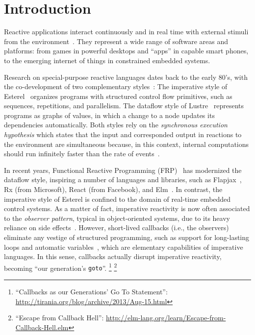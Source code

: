 \documentclass[preprint]{sigplanconf}
\newcommand{\code}[1] {{\small{\texttt{#1}}}}
\newcommand{\1}{\;}
\newcommand{\2}{\;\;}
\newcommand{\3}{\;\;\;}
\newcommand{\5}{\;\;\;\;\;}
\begin{document}


\section{Introduction}
\label{sec.intro}

Reactive applications interact continuously and in real time with external 
stimuli from the environment~\cite{statecharts.reactive,rp.synchronous}.
They represent a wide range of software areas and platforms: from games in 
powerful desktops and ``apps'' in capable smart phones, to the emerging 
internet of things in constrained embedded systems.

Research on special-purpose reactive languages dates back to the early 80's, 
with the co-development of two complementary 
styles~\cite{rp.twelve,rp.hypothesis}:
%
The imperative style of Esterel~\cite{esterel.ieee91} organizes programs with 
structured control flow primitives, such as sequences, repetitions, and 
parallelism.
%
The dataflow style of Lustre~\cite{lustre.ieee91} represents programs as graphs 
of values, in which a change to a node updates its dependencies automatically.
%
Both styles rely on the \emph{synchronous execution hypothesis} which states 
that the input and corresponded output in reactions to the environment are 
simultaneous because, in this context, internal computations should run 
infinitely faster than the rate of events~\cite{rp.hypothesis}.

In recent years, Functional Reactive Programming (FRP)~\cite{frp.principles} 
has modernized the dataflow style, inspiring a number of languages and 
libraries, such as Flapjax~\cite{frp.flapjax}, Rx (from Microsoft), React (from 
Facebook), and Elm~\cite{frp.elm}.
%
In contrast, the imperative style of Esterel is confined to the domain of 
real-time embedded control systems.
%
As a matter of fact, imperative reactivity is now often associated to the 
\emph{observer pattern}, typical in object-oriented systems, due to its heavy
reliance on side effects~\cite{rp.deprecating,rp.rescala,gamepatterns}.
%
However, short-lived callbacks (i.e., the observers) eliminate any vestige of 
structured programming, such as support for long-lasting loops and automatic 
variables~\cite{sync_async.cooperative}, which are elementary capabilities of 
imperative languages.
%
In this sense, callbacks actually disrupt imperative reactivity, becoming ``our 
generation's \code{goto}''.%
\footnote{``Callbacks as our Generations' Go To Statement'':
\url{http://tirania.org/blog/archive/2013/Aug-15.html}}%
\footnote{``Escape from Callback Hell'':
\url{http://elm-lang.org/learn/Escape-from-Callback-Hell.elm}}
\end{document}
